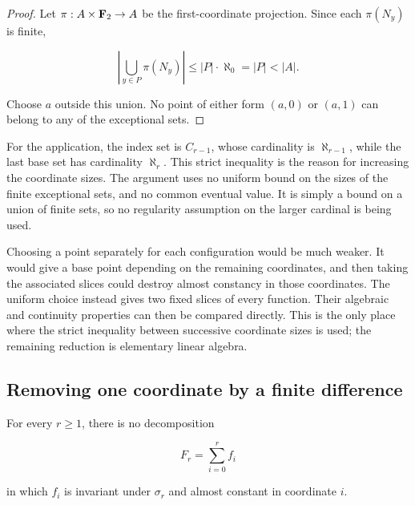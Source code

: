 \begin{proof}
Let \(\pi:A\times\mathbf F_2\to A\) be the first-coordinate projection.  Since
each \(\pi(N_y)\) is finite,

\[
\left|\bigcup_{y\in P}\pi(N_y)\right|
\leq |P|\cdot\aleph_0
=|P|
<|A|.
\]

Choose \(a\) outside this union.  No point of either form \((a,0)\) or
\((a,1)\) can belong to any of the exceptional sets.
\end{proof}

For the application, the index set is \(C_{r-1}\), whose cardinality is
\(\aleph_{r-1}\), while the last base set has cardinality \(\aleph_r\).
This strict inequality is the reason for increasing the coordinate sizes.
The argument uses no uniform bound on the sizes of the finite exceptional
sets, and no common eventual value.  It is simply a bound on a union of
finite sets, so no regularity assumption on the larger cardinal is being
used.

Choosing a point separately for each configuration would be much weaker.
It would give a base point depending on the remaining coordinates, and
then taking the associated slices could destroy almost constancy in
those coordinates.  The uniform choice instead gives two fixed slices
of every function.  Their algebraic and continuity properties can then
be compared directly.  This is the only place where the strict inequality
between successive coordinate sizes is used; the remaining reduction is
elementary linear algebra.  

\subsection{Removing one coordinate by a finite difference}

\begin{proposition}\label{prop:nondecomposition}
For every \(r\geq1\), there is no decomposition

\[
F_r=\sum_{i=0}^{r}f_i
\]

in which \(f_i\) is invariant under \(\sigma_r\) and almost constant in
coordinate \(i\).
\end{proposition}

